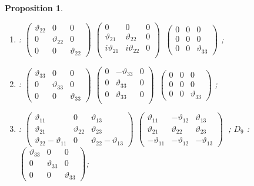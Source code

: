 \documentclass[11pt,twoside,reqno]{amsart}
\theoremstyle{plain}
\newtheorem{proposition}[thm]{Proposition}
\theoremstyle{definition}
\begin{document}
\begin{proposition}
\begin{enumerate}
\item[$D_6$] : 
$\left(\begin{array}{ccc}
\vartheta_{22}&0&0\\
0&\vartheta_{22}&0\\
0&0&\vartheta_{22}
\end{array}
\right)$
$\left(\begin{array}{ccc}
0&0&0\\
\vartheta_{21}&\vartheta_{22}&0\\
i\vartheta_{21}&i\vartheta_{22}&0\\
\end{array}
\right) $\ 
$\left(\begin{array}{ccc}
0&0&0\\
0&0&0\\
0&0&\vartheta_{33}
\end{array}
\right)$
;

\item[$D_7$] : 
$\left(\begin{array}{ccc}
\vartheta_{33}&0&0\\
0&\vartheta_{33}&0\\
0&0&\vartheta_{33}
\end{array}
\right)$
$\left(\begin{array}{ccc}
0&-\vartheta_{33}&0\\
0&\vartheta_{33}&0\\
0&\vartheta_{33}&0\\
\end{array}
\right) $\ 
$\left(\begin{array}{ccc}
0&0&0\\
0&0&0\\
0&0&\vartheta_{33}
\end{array}
\right)$
;

\item[$D_8$] : 
$\left(\begin{array}{ccc}
\vartheta_{11}&0&\vartheta_{13}\\
\vartheta_{21}&\vartheta_{22}&\vartheta_{23}\\
\vartheta_{22}-\vartheta_{11}&0&\vartheta_{22}-\vartheta_{13}
\end{array}
\right)$
$\left(\begin{array}{ccc}
\vartheta_{11}&-\vartheta_{12}&\vartheta_{13}\\
\vartheta_{21}&\vartheta_{22}&\vartheta_{23}\\
-\vartheta_{11}&-\vartheta_{12}&-\vartheta_{13}
\end{array}
\right)\ $
;
$D_9$ : 
$\left(\begin{array}{ccc}
\vartheta_{33}&0&0\\
0&\vartheta_{33}&0\\
0&0&\vartheta_{33}
\end{array}
\right)$;


\end{enumerate}
\end{proposition}
\end{document}
